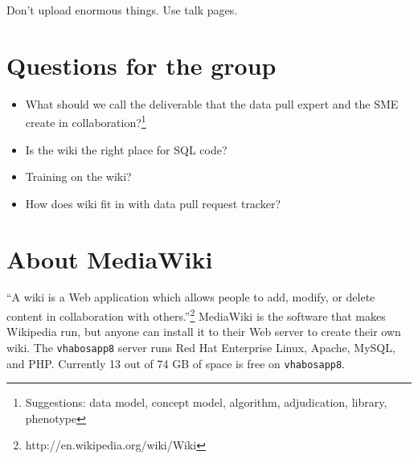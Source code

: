 \documentclass{tufte-handout}
\begin{document}
Don't upload enormous things. Use talk pages. 

\section{Questions for the group}

\begin{itemize}

\item What should we call the deliverable that the data pull expert
  and the SME create in collaboration?\footnote{Suggestions: data
    model, concept model, algorithm, adjudication, library, phenotype}

\item Is the wiki the right place for SQL code?

\item Training on the wiki?

\item How does wiki fit in with data pull request tracker?

\end{itemize}

\section{About MediaWiki}

``A wiki is a Web application which allows people to add, modify, or
delete content in collaboration with
others.''\footnote{http://en.wikipedia.org/wiki/Wiki} MediaWiki is the
software that makes Wikipedia run, but anyone can install it to their
Web server to create their own wiki. The \texttt{vhabosapp8} server
runs Red Hat Enterprise Linux, Apache, MySQL, and PHP. Currently 13
out of 74 GB of space is free on \texttt{vhabosapp8}.
\end{document}
